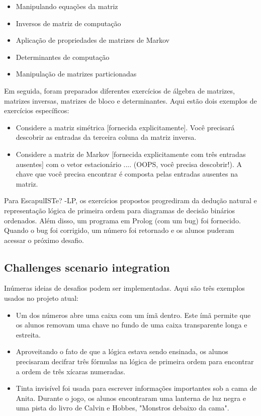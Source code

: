 \begin{itemize}
    \item Manipulando equações da matriz
    \item Inversos de matriz de computação
    \item Aplicação de propriedades de matrizes de Markov
    \item Determinantes de computação
    \item Manipulação de matrizes particionadas
\end{itemize}

Em seguida, foram preparados diferentes exercícios de álgebra de matrizes, matrizes inversas, matrizes de bloco e determinantes. Aqui estão dois exemplos de exercícios específicos:

\begin{itemize}
    \item Considere a matriz simétrica [fornecida explicitamente]. Você precisará descobrir as entradas da terceira coluna da matriz inversa.
    \item Considere a matriz de Markov [fornecida explicitamente com três entradas ausentes] com o vetor estacionário .... (OOPS, você precisa descobrir!). A chave que você precisa encontrar é composta pelas entradas ausentes na matriz.
\end{itemize}

Para EscapulISTe? -LP, os exercícios propostos progrediram da dedução natural e representação lógica de primeira ordem para diagramas de decisão binários ordenados. Além disso, um programa em Prolog (com um bug) foi fornecido. Quando o bug foi corrigido, um número foi retornado e os alunos puderam acessar o próximo desafio.

\subsection{Challenges scenario integration}

Inúmeras ideias de desafios podem ser implementadas. Aqui são três exemplos usados no projeto atual:

\begin{itemize}
    \item Um dos números abre uma caixa com um ímã dentro. Este ímã permite que os alunos removam uma chave no fundo de uma caixa transparente longa e estreita.
    \item Aproveitando o fato de que a lógica estava sendo ensinada, os alunos precisaram decifrar três fórmulas na lógica de primeira ordem para encontrar a ordem de três xícaras numeradas.
    \item Tinta invisível foi usada para escrever informações importantes sob a cama de Anita. Durante o jogo, os alunos encontraram uma lanterna de luz negra e uma pista do livro de Calvin e Hobbes, "Monstros debaixo da cama".
\end{itemize}

